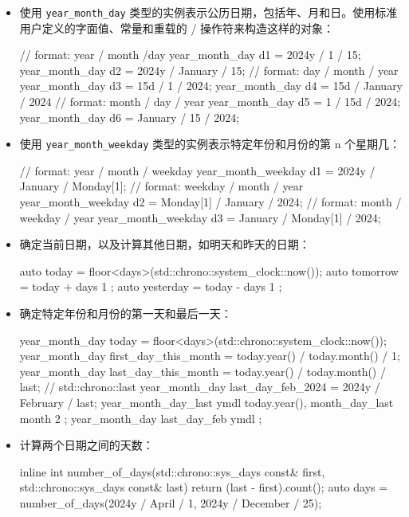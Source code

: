 \begin{itemize}
\item
使用 \verb|year_month_day| 类型的实例表示公历日期，包括年、月和日。使用标准用户定义的字面值、常量和重载的 / 操作符来构造这样的对象：

\begin{cpp}
// format: year / month /day
year_month_day d1 = 2024y / 1 / 15;
year_month_day d2 = 2024y / January / 15;
// format: day / month / year
year_month_day d3 = 15d / 1 / 2024;
year_month_day d4 = 15d / January / 2024
// format: month / day / year
year_month_day d5 = 1 / 15d / 2024;
year_month_day d6 = January / 15 / 2024;
\end{cpp}

\item
使用 \verb|year_month_weekday| 类型的实例表示特定年份和月份的第 n 个星期几：

\begin{cpp}
// format: year / month / weekday
year_month_weekday d1 = 2024y / January / Monday[1];
// format: weekday / month / year
year_month_weekday d2 = Monday[1] / January / 2024;
// format: month / weekday / year
year_month_weekday d3 = January / Monday[1] / 2024;
\end{cpp}

\item
确定当前日期，以及计算其他日期，如明天和昨天的日期：

\begin{cpp}
auto today = floor<days>(std::chrono::system_clock::now());
auto tomorrow = today + days{ 1 };
auto yesterday = today - days{ 1 };
\end{cpp}

\item
确定特定年份和月份的第一天和最后一天：

\begin{cpp}
year_month_day today = floor<days>(std::chrono::system_clock::now());
year_month_day first_day_this_month = today.year() / today.month() / 1;
year_month_day last_day_this_month = today.year() / today.month() / last; // std::chrono::last
year_month_day last_day_feb_2024 = 2024y / February / last;
year_month_day_last ymdl {today.year(), month_day_last{ month{ 2 } }};
year_month_day last_day_feb { ymdl };
\end{cpp}

\item
计算两个日期之间的天数：

\begin{cpp}
inline int number_of_days(std::chrono::sys_days const& first,
                          std::chrono::sys_days const& last)
{
    return (last - first).count();
}
auto days = number_of_days(2024y / April / 1,
2024y / December / 25);
\end{cpp}


\end{itemize}
